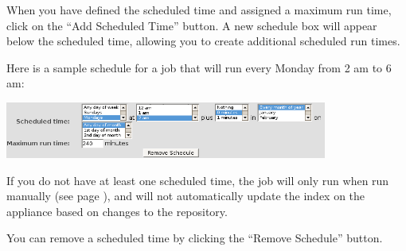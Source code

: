 \begin{itemize}
When you have defined the scheduled time and assigned a maximum run
time, click on the ``Add Scheduled Time'' button. A new schedule box
will appear below the scheduled time, allowing you to create
additional scheduled run times.

Here is a sample schedule for a job that will run every
Monday from 2 am to 6 am:

\begin{changemargin}{-.3in}{0in} 
\includegraphics[width=300pt]{sample-schedule}
\end{changemargin}

If you do not have at least one scheduled time, the job will
only run when run manually (see page \pageref{ManageJobs}), and will
not automatically update the index on the appliance based on changes
to the repository.

You can remove a scheduled time by clicking the ``Remove Schedule''
button.

\end{itemize}

